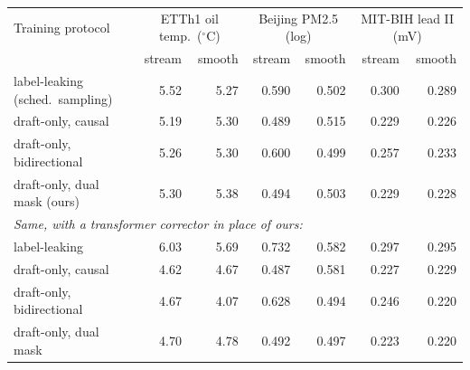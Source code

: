 \begin{tabular}{lrrrrrr}
\toprule
Training protocol & \multicolumn{2}{c}{ETTh1 oil temp.\ ($^\circ$C)} & \multicolumn{2}{c}{Beijing PM2.5 (log)} & \multicolumn{2}{c}{MIT-BIH lead II (mV)} \\
 & stream & smooth & stream & smooth & stream & smooth \\
\midrule
label-leaking (sched.\ sampling) & 5.52 & 5.27 & 0.590 & 0.502 & 0.300 & 0.289 \\
draft-only, causal & 5.19 & 5.30 & 0.489 & 0.515 & 0.229 & 0.226 \\
draft-only, bidirectional & 5.26 & 5.30 & 0.600 & 0.499 & 0.257 & 0.233 \\
draft-only, dual mask (ours) & 5.30 & 5.38 & 0.494 & 0.503 & 0.229 & 0.228 \\
\midrule
\multicolumn{7}{l}{\emph{Same, with a transformer corrector in place of ours:}} \\
\quad label-leaking & 6.03 & 5.69 & 0.732 & 0.582 & 0.297 & 0.295 \\
\quad draft-only, causal & 4.62 & 4.67 & 0.487 & 0.581 & 0.227 & 0.229 \\
\quad draft-only, bidirectional & 4.67 & 4.07 & 0.628 & 0.494 & 0.246 & 0.220 \\
\quad draft-only, dual mask & 4.70 & 4.78 & 0.492 & 0.497 & 0.223 & 0.220 \\
\bottomrule
\end{tabular}
